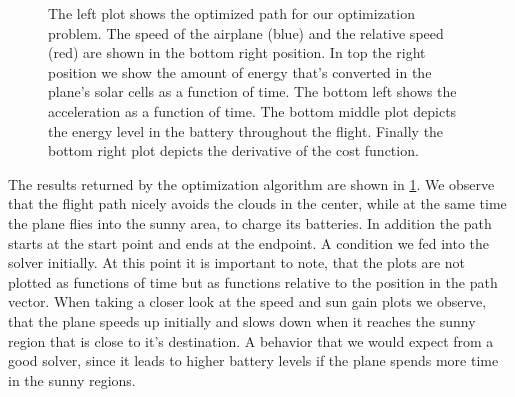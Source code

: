 \begin{figure}
\begin{minipage}[c][11cm][t]{.5\textwidth}
  \label{fig:test3}
\end{minipage}
\caption{The left plot shows the optimized path for our optimization problem. The speed of the airplane (blue) and the relative speed (red) are shown in the bottom right position. In top the right position we show the amount of energy that's converted in the plane's solar cells as a function of time. The bottom left shows the acceleration as a function of time. The bottom middle plot depicts the energy level in the battery throughout the flight. Finally the bottom right plot depicts the derivative of the cost function.}
\label{fig:badPlot}
\end{figure}
The results returned by the optimization algorithm are shown in \ref{fig:badPlot}. We observe that the flight path nicely avoids the clouds in the center, while at the same time the plane flies into the sunny area, to charge its batteries. In addition the path starts at the start point and ends at the endpoint. A condition we fed into the solver initially. 
At this point it is important to note, that the plots are not plotted as functions of time but as functions relative to the position in the path vector. When taking a closer look at the speed and sun gain plots we observe, that the plane speeds up initially and slows down when it reaches the sunny region that is close to it's destination. A behavior that we would expect from a good solver, since it leads to higher battery levels if the plane spends more time in the sunny regions.
